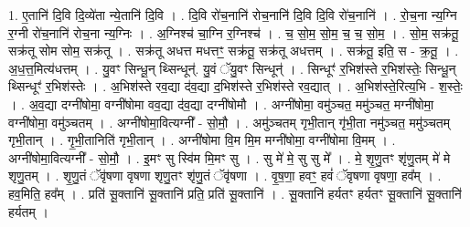 \documentclass[17pt]{extarticle}
\begin{document}
1. ए॒तानि॑ दि॒वि दि॒व्ये॑ता न्ये॒तानि॑ दि॒वि । . दि॒वि रो॑च॒नानि॑ रोच॒नानि॑ दि॒वि दि॒वि रो॑च॒नानि॑ । . रो॒च॒ना न्य॒ग्नि र॒ग्नी रो॑च॒नानि॑ रोच॒ना न्य॒ग्निः । . अ॒ग्निश्च॑ चा॒ग्नि र॒ग्निश्च॑ । . च॒ सो॒म॒ सो॒म॒ च॒ च॒ सो॒म॒ । . सो॒म॒ सक्र॑तू॒ सक्र॑तू सोम सोम॒ सक्र॑तू । . सक्र॑तू अधत्त मधत्तꣳ॒॒ सक्र॑तू॒ सक्र॑तू अधत्तम् । . सक्र॑तू॒ इति॒ स - क्र॒तू॒ । . अ॒ध॒त्त॒मित्य॑धत्तम् । . यु॒वꣳ सिन्धू॒न् थ्सिन्धून्॑. यु॒वं ॅयु॒वꣳ सिन्धून्॑ । . सिन्धूꣳ॑ र॒भिश॑स्ते र॒भिश॑स्तेः॒ सिन्धू॒न् थ्सिन्धूꣳ॑ र॒भिश॑स्तेः । . अ॒भिश॑स्ते रव॒द्या द॑व॒द्या द॒भिश॑स्ते र॒भिश॑स्ते रव॒द्यात् । . अ॒भिश॑स्ते॒रित्य॒भि - श॒स्तेः॒ । . अ॒व॒द्या दग्नी॑षोमा॒ वग्नी॑षोमा वव॒द्या द॑व॒द्या दग्नी॑षोमौ । . अग्नी॑षोमा॒ वमु॑ञ्चत॒ ममु॑ञ्चत॒ मग्नी॑षोमा॒ वग्नी॑षोमा॒ वमु॑ञ्चतम् । . अग्नी॑षोमा॒वित्यग्नी᳚ - सो॒मौ॒ । . अमु॑ञ्चतम् गृभी॒तान् गृ॑भी॒ता नमु॑ञ्चत॒ ममु॑ञ्चतम् गृभी॒तान् । . गृ॒भी॒तानिति॑ गृभी॒तान् । . अग्नी॑षोमा वि॒म मि॒म मग्नी॑षोमा॒ वग्नी॑षोमा वि॒मम् । . अग्नी॑षोमा॒वित्यग्नी᳚ - सो॒मौ॒ । . इ॒मꣳ सु स्वि॑म मि॒मꣳ सु । . सु मे॑ मे॒ सु सु मे᳚ । . मे॒ शृ॒णु॒तꣳ शृ॑णु॒तम् मे॑ मे शृणु॒तम् । . शृ॒णु॒तं ॅवृ॑षणा वृषणा शृणु॒तꣳ शृ॑णु॒तं ॅवृ॑षणा । . वृ॒ष॒णा॒ हवꣳ॒॒ हवं॑ ॅवृषणा वृषणा॒ हव᳚म् । . हव॒मिति॒ हव᳚म् । . प्रति॑ सू॒क्तानि॑ सू॒क्तानि॑ प्रति॒ प्रति॑ सू॒क्तानि॑ । . सू॒क्तानि॑ हर्यतꣳ हर्यतꣳ सू॒क्तानि॑ सू॒क्तानि॑ हर्यतम् । \newline
\end{document}
